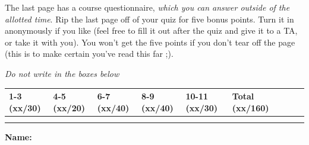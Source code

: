\documentclass[11pt]{article}
\newcounter{answer}
\begin{document}
\begin{center}
\begin{boxedminipage}[h]{6in}
\vspace{.05in} 
The last page has a course questionnaire, {\em which you can
answer outside of the allotted time}.  Rip the last page off of your
quiz for five bonus points.  Turn it in anonymously if you like (feel
free to fill it out after the quiz and give it to a TA, or take it with
you).  
You
won't get the five points if you don't tear off the page (this is to
make certain you've read this far ;).
\fi 

\end{boxedminipage}
\end{center}
\vspace*{0.05in}
\begin{center}
{\it Do not write in the boxes below}
\end{center}

\begin{center}
\begin{tabular}{|l|l|l|l|l|l|l|l|l|} \hline \hline
{\bf 1-3 (xx/30)} & {\bf 4-5 (xx/20)} & {\bf 6-7 (xx/40)} & {\bf 8-9
  (xx/40)} & {\bf 10-11 (xx/30)} & {\bf Total
  (xx/160)}  \\ \hline 
& & & & & \\ 
& & & & & \\ \hline \hline
\end{tabular}
\end{center}

\vspace{.1in}
{\bf\Large{Name:}}

\newpage
\pagestyle{fancy}







\label{lastpage}
\end{document}
